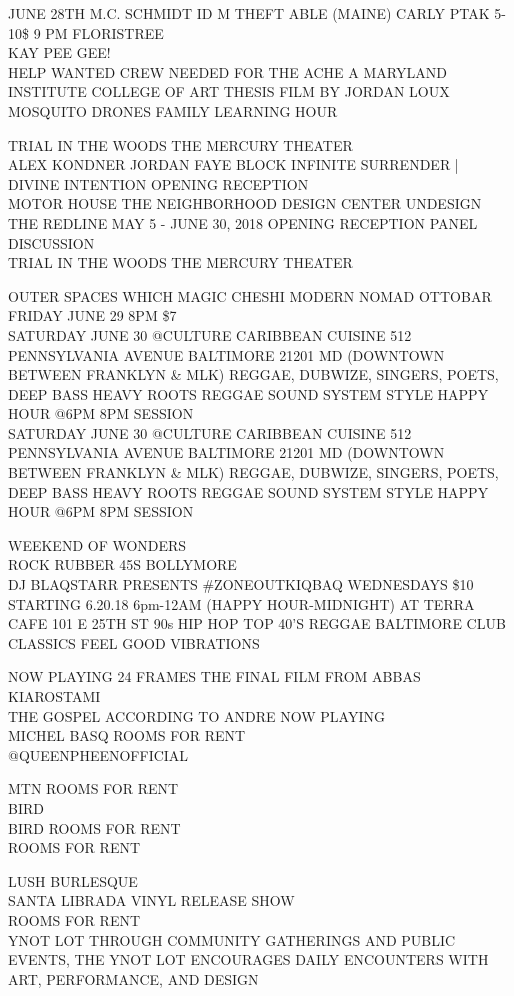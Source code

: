 \documentclass[10pt,letterpaper]{article}
\begin{document}
JUNE 28TH M.C. SCHMIDT ID M THEFT ABLE (MAINE) CARLY PTAK 5{-}10\$ 9 PM FLORISTREE\\
KAY PEE GEE!\\
HELP WANTED CREW NEEDED FOR THE ACHE A MARYLAND INSTITUTE COLLEGE OF ART THESIS FILM BY JORDAN LOUX\\
MOSQUITO DRONES FAMILY LEARNING HOUR

TRIAL IN THE WOODS THE MERCURY THEATER\\
ALEX KONDNER JORDAN FAYE BLOCK INFINITE SURRENDER | DIVINE INTENTION OPENING RECEPTION\\
MOTOR HOUSE THE NEIGHBORHOOD DESIGN CENTER UNDESIGN THE REDLINE MAY 5 {-} JUNE 30, 2018 OPENING RECEPTION PANEL DISCUSSION\\
TRIAL IN THE WOODS THE MERCURY THEATER

OUTER SPACES WHICH MAGIC CHESHI MODERN NOMAD OTTOBAR FRIDAY JUNE 29 8PM \$7\\
SATURDAY JUNE 30 @CULTURE CARIBBEAN CUISINE 512 PENNSYLVANIA AVENUE BALTIMORE 21201 MD (DOWNTOWN BETWEEN FRANKLYN \& MLK) REGGAE, DUBWIZE, SINGERS, POETS, DEEP BASS HEAVY ROOTS REGGAE SOUND SYSTEM STYLE HAPPY HOUR @6PM 8PM SESSION\\
SATURDAY JUNE 30 @CULTURE CARIBBEAN CUISINE 512 PENNSYLVANIA AVENUE BALTIMORE 21201 MD (DOWNTOWN BETWEEN FRANKLYN \& MLK) REGGAE, DUBWIZE, SINGERS, POETS, DEEP BASS HEAVY ROOTS REGGAE SOUND SYSTEM STYLE HAPPY HOUR @6PM 8PM SESSION

WEEKEND OF WONDERS\\
ROCK RUBBER 45S BOLLYMORE\\
DJ BLAQSTARR PRESENTS \#ZONEOUTKIQBAQ WEDNESDAYS \$10 STARTING 6.20.18 6pm{-}12AM (HAPPY HOUR{-}MIDNIGHT) AT TERRA CAFE 101 E 25TH ST 90s HIP HOP TOP 40'S REGGAE BALTIMORE CLUB CLASSICS FEEL GOOD VIBRATIONS

NOW PLAYING 24 FRAMES THE FINAL FILM FROM ABBAS KIAROSTAMI\\
THE GOSPEL ACCORDING TO ANDRE NOW PLAYING\\
MICHEL BASQ ROOMS FOR RENT\\
@QUEENPHEENOFFICIAL

MTN ROOMS FOR RENT\\
BIRD\\
BIRD ROOMS FOR RENT\\
ROOMS FOR RENT

LUSH BURLESQUE\\
SANTA LIBRADA VINYL RELEASE SHOW\\
ROOMS FOR RENT\\
YNOT LOT THROUGH COMMUNITY GATHERINGS AND PUBLIC EVENTS, THE YNOT LOT ENCOURAGES DAILY ENCOUNTERS WITH ART, PERFORMANCE, AND DESIGN
\end{document}
